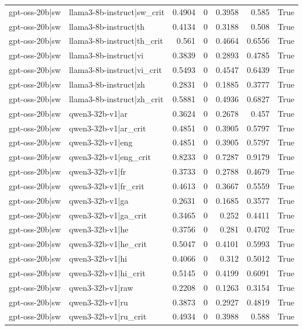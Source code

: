 \begin{table}
\begin{tabular}{l l r r r r l}
gpt-oss-20b|sw & llama3-8b-instruct|sw_crit & 0.4904 & 0 & 0.3958 & 0.585 & True \\
gpt-oss-20b|sw & llama3-8b-instruct|th & 0.4134 & 0 & 0.3188 & 0.508 & True \\
gpt-oss-20b|sw & llama3-8b-instruct|th_crit & 0.561 & 0 & 0.4664 & 0.6556 & True \\
gpt-oss-20b|sw & llama3-8b-instruct|vi & 0.3839 & 0 & 0.2893 & 0.4785 & True \\
gpt-oss-20b|sw & llama3-8b-instruct|vi_crit & 0.5493 & 0 & 0.4547 & 0.6439 & True \\
gpt-oss-20b|sw & llama3-8b-instruct|zh & 0.2831 & 0 & 0.1885 & 0.3777 & True \\
gpt-oss-20b|sw & llama3-8b-instruct|zh_crit & 0.5881 & 0 & 0.4936 & 0.6827 & True \\
gpt-oss-20b|sw & qwen3-32b-v1|ar & 0.3624 & 0 & 0.2678 & 0.457 & True \\
gpt-oss-20b|sw & qwen3-32b-v1|ar_crit & 0.4851 & 0 & 0.3905 & 0.5797 & True \\
gpt-oss-20b|sw & qwen3-32b-v1|eng & 0.4851 & 0 & 0.3905 & 0.5797 & True \\
gpt-oss-20b|sw & qwen3-32b-v1|eng_crit & 0.8233 & 0 & 0.7287 & 0.9179 & True \\
gpt-oss-20b|sw & qwen3-32b-v1|fr & 0.3733 & 0 & 0.2788 & 0.4679 & True \\
gpt-oss-20b|sw & qwen3-32b-v1|fr_crit & 0.4613 & 0 & 0.3667 & 0.5559 & True \\
gpt-oss-20b|sw & qwen3-32b-v1|ga & 0.2631 & 0 & 0.1685 & 0.3577 & True \\
gpt-oss-20b|sw & qwen3-32b-v1|ga_crit & 0.3465 & 0 & 0.252 & 0.4411 & True \\
gpt-oss-20b|sw & qwen3-32b-v1|he & 0.3756 & 0 & 0.281 & 0.4702 & True \\
gpt-oss-20b|sw & qwen3-32b-v1|he_crit & 0.5047 & 0 & 0.4101 & 0.5993 & True \\
gpt-oss-20b|sw & qwen3-32b-v1|hi & 0.4066 & 0 & 0.312 & 0.5012 & True \\
gpt-oss-20b|sw & qwen3-32b-v1|hi_crit & 0.5145 & 0 & 0.4199 & 0.6091 & True \\
gpt-oss-20b|sw & qwen3-32b-v1|raw & 0.2208 & 0 & 0.1263 & 0.3154 & True \\
gpt-oss-20b|sw & qwen3-32b-v1|ru & 0.3873 & 0 & 0.2927 & 0.4819 & True \\
gpt-oss-20b|sw & qwen3-32b-v1|ru_crit & 0.4934 & 0 & 0.3988 & 0.588 & True \\

\end{tabular}
\end{table}

